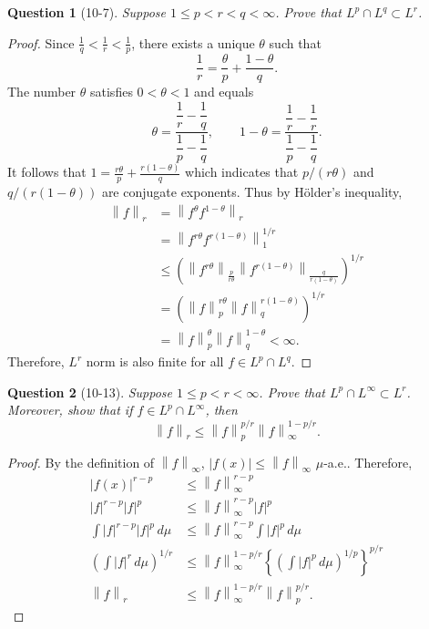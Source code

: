 \documentclass[11pt]{article}
\theoremstyle{quest}
\newtheorem*{question}{Question}
\begin{document}
\begin{question}[10-7]
  Suppose $1 \leq p < r < q < \infty$. Prove that $L^{p} \cap L^{q} \subset L^{r}$.
\end{question}
\begin{proof}
  Since $\frac{1}{q} < \frac{1}{r} < \frac{1}{p}$, there exists a unique $\theta$ such that
  $$
    \frac{1}{r} = \frac{\theta}{p} + \frac{1-\theta}{q}.
  $$
  The number $\theta$ satisfies $0 < \theta < 1$ and equals
  $$
    \theta = \dfrac{\dfrac{1}{r} - \dfrac{1}{q}}{\dfrac{1}{p}-\dfrac{1}{q}}, \qquad 1-\theta = \dfrac{\dfrac{1}{r}-\dfrac{1}{r}}{\dfrac{1}{p}-\dfrac{1}{q}}.
  $$
  It follows that $1 = \frac{r\theta}{p}+\frac{r\left(1-\theta\right)}{q}$ which indicates that $p/\left(r\theta\right)$ and $q/\left(r\left(1-\theta\right)\right)$ are conjugate exponents. Thus by Hölder's inequality,
  \begin{align}
    \left\|f\right\|_{r} &= \left\|f^{\theta}f^{1-\theta}\right\|_{r}\\
    &=\left\|f^{r\theta}f^{r\left(1-\theta\right)}\right\|_{1}^{1/r}\\
    &\leq \left(\left\|f^{r\theta}\right\|_{\frac{p}{r\theta}}\left\|f^{r\left(1-\theta\right)}\right\|_{\frac{q}{r\left(1-\theta\right)}}\right)^{1/r}\\
    &= \left(\left\|f\right\|_{p}^{r\theta}\left\|f\right\|_{q}^{r\left(1-\theta\right)}\right)^{1/r}\\
    &=\left\|f\right\|_{p}^{\theta}\left\|f\right\|_{q}^{1-\theta} < \infty.
  \end{align}
Therefore, $L^{r}$ norm is also finite for all $f \in L^{p}\cap L^{q}$.
\end{proof}

\begin{question}[10-13]
  Suppose $1 \leq p < r< \infty$. Prove that $L^{p} \cap L^{\infty} \subset L^{r}$. Moreover, show that if $f \in L^{p}\cap L^{\infty}$, then
  $$
    \left\|f\right\|_{r} \leq \left\|f\right\|_{p}^{p/r}\left\|f\right\|_{\infty}^{1-p/r}.
  $$
\end{question}

\begin{proof}
  By the definition of $\left\|f\right\|_{\infty}$, $\left|f\left(x\right)\right|\leq \left\|f\right\|_{\infty}$ $\mu$-a.e.. Therefore,
  \begin{align*}
    \left|f\left(x\right)\right|^{r-p} &\leq \left\|f\right\|_{\infty}^{r-p}\\
    \left|f\right|^{r-p}\left|f\right|^{p} &\leq \left\|f\right\|_{\infty}^{r-p}\left|f\right|^{p}\\
    \int \left|f\right|^{r-p}\left|f\right|^{p}\,d\mu &\leq \left\|f\right\|_{\infty}^{r-p}\int \left|f\right|^{p}\,d\mu \\
    \left(\int \left|f\right|^{r}\,d\mu \right)^{1/r} &\leq \left\|f\right\|_{\infty}^{1-p/r}\left\{\left(\int \left|f\right|^{p}\,d\mu \right)^{1/p} \right\}^{p/r}\\
    \left\|f\right\|_{r} &\leq \left\|f\right\|_{\infty}^{1-p/r}\left\|f\right\|_{p}^{p/r}.
  \end{align*}
\end{proof}
\end{document}
